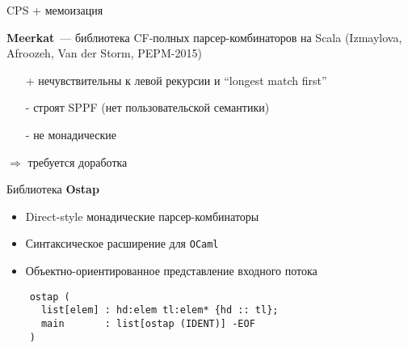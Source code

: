 \documentclass[10pt, mathserif]{beamer}
\theoremstyle{definition}
\begin{document}
\begin{frame}[fragile]{CPS + мемоизация}

  \textbf{Meerkat}~--- библиотека CF-полных парсер-комбинаторов на Scala (Izmaylova, Afroozeh, Van der Storm, PEPM-2015)
  \vskip3mm

  \begin{itemize}
    \item[+] нечувствительны к левой рекурсии и ``longest match first''
    \item[-] строят SPPF (нет пользовательской семантики)
    \item[-] не монадические
  \end{itemize}
  \vskip3mm

  $\Rightarrow$ требуется доработка

\end{frame}

\begin{frame}[fragile]{Библиотека \textbf{Ostap}}
  \begin{itemize}
    \item Direct-style монадические парсер-комбинаторы
    \item Синтаксическое расширение для \texttt{OCaml}
    \item Объектно-ориентированное представление входного потока
  \end{itemize}
  \vskip3mm
  \begin{lstlisting}
    ostap (
      list[elem] : hd:elem tl:elem* {hd :: tl};
      main       : list[ostap (IDENT)] -EOF
    )
  \end{lstlisting}

\end{frame}
\end{document}

